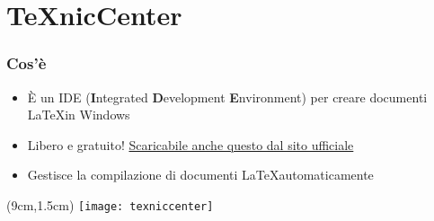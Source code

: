 \section{TeXnicCenter}
  \begin{frame}
    \frametitle{Cos'è}
    
    \begin{itemize}
      \item È un IDE (\textbf{I}ntegrated \textbf{D}evelopment 
\textbf{E}nvironment) per creare documenti \LaTeX in Windows
      \item Libero e gratuito! 
\href{http://www.texniccenter.org/download/}{Scaricabile anche questo dal sito 
ufficiale}
      \item Gestisce la compilazione di documenti \LaTeX automaticamente
    \end{itemize}
    
    \begin{textblock*}{5cm}(9cm,1.5cm)
      \texttt{[image: texniccenter]}
    \end{textblock*}

  \end{frame}